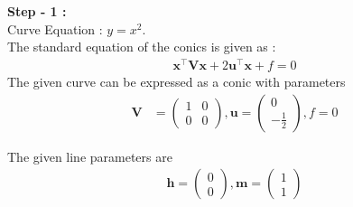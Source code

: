 \documentclass[10pt,a4paper]{report}
\newcommand{\myvec}[1]{\ensuremath{\begin{pmatrix}#1\end{pmatrix}}}
\let\vec\mathbf
\begin{document}
\begin{multicols}{2}
\raggedright \textbf{Step - 1 :}\\ \vspace{2mm}
Curve Equation : $y=x^2$. \\ \vspace{1mm}
The standard equation of the conics is given as :
\begin{align}
\vec{x}^{\top}\vec{V}\vec{x}+2\vec{u}^{\top}\vec{x}+f=0
\end{align}
\fi
The given curve  can be expressed as a conic with parameters
\begin{align}
	\vec{V} &= \myvec{1 & 0\\0 & 0}, \vec{u} = \myvec{0 \\-\frac{1}{2}}, f = 0
	\end{align}

The given line parameters are
\begin{align}
\vec{h} = \myvec{0 \\0}, \vec{m}=\myvec{1\\1}
\end{align}
\iffalse


\end{multicols}
\end{document}
